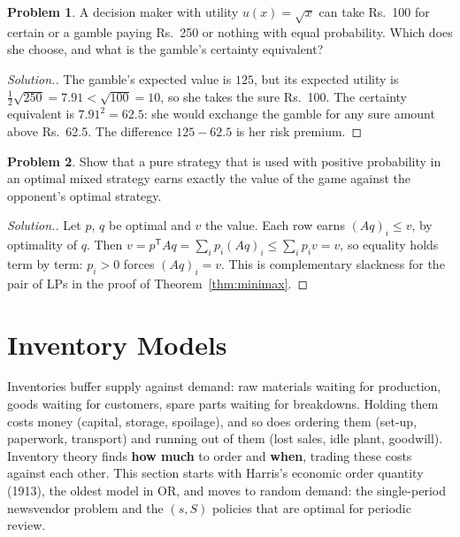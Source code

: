 \documentclass[11pt,a4paper]{article}
\numberwithin{equation}{section}
\theoremstyle{definition}
\newtheorem{problemx}{Problem}[subsection]
\newenvironment{problem}{\begin{problemx}}{\end{problemx}}
\newenvironment{solution}
  {\renewcommand{\qedsymbol}{}\begin{proof}[\textit{Solution}.]}
  {\end{proof}}
\begin{document}
\begin{problem}
A decision maker with utility $u(x) = \sqrt x$ can take Rs.~100 for certain or a gamble paying Rs.~250 or nothing with equal probability. Which does she choose, and what is the gamble's certainty equivalent?
\end{problem}

\begin{solution}
The gamble's expected value is $125$, but its expected utility is $\frac12\sqrt{250} = 7.91 < \sqrt{100} = 10$, so she takes the sure Rs.~100. The certainty equivalent is $7.91^2 = 62.5$: she would exchange the gamble for any sure amount above Rs.~62.5. The difference $125 - 62.5$ is her risk premium.
\end{solution}

\begin{problem}
Show that a pure strategy that is used with positive probability in an optimal mixed strategy earns exactly the value of the game against the opponent's optimal strategy.
\end{problem}

\begin{solution}
Let $p$, $q$ be optimal and $v$ the value. Each row earns $(Aq)_i \leq v$, by optimality of $q$. Then $v = p^{\mathsf T}Aq = \sum_ip_i(Aq)_i \leq \sum_ip_iv = v$, so equality holds term by term: $p_i > 0$ forces $(Aq)_i = v$. This is complementary slackness for the pair of LPs in the proof of
Theorem~\ref{thm:minimax}.
\end{solution}

\section{Inventory Models}
\label{sec:inventory}

Inventories buffer supply against demand: raw materials waiting for production, goods waiting for customers, spare parts waiting for breakdowns. Holding them costs money (capital, storage, spoilage), and so does ordering them (set-up, paperwork, transport) and running out of them (lost sales, idle plant, goodwill). Inventory
theory finds \textbf{how much} to order and \textbf{when}, trading these costs against each other. This section starts with Harris's economic order quantity (1913), the oldest model in OR, and moves to random demand: the single-period newsvendor problem and the $(s, S)$ policies that are optimal for periodic review.
\end{document}

